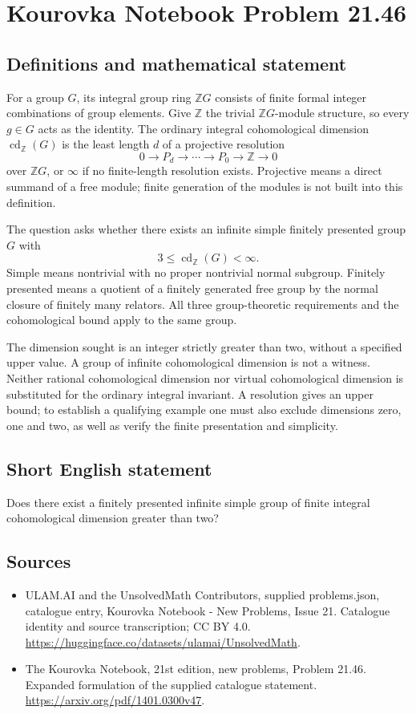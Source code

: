 \documentclass[11pt,a4paper]{article}
\begin{document}
\section*{Kourovka Notebook Problem 21.46}\label{statement}

\subsection{Definitions and mathematical statement}
For a group $G$, its integral group ring $\mathbb ZG$ consists of
finite formal integer combinations of group elements. Give $\mathbb Z$
the trivial $\mathbb ZG$-module structure, so every $g\in G$ acts as
the identity. The ordinary integral cohomological dimension
$\operatorname{cd}_{\mathbb Z}(G)$ is the least length $d$ of a projective
resolution
\[
 0\longrightarrow P_d\longrightarrow\cdots\longrightarrow P_0
          \longrightarrow\mathbb Z\longrightarrow0
\]
over $\mathbb ZG$, or $\infty$ if no finite-length resolution exists.
Projective means a direct summand of a free module; finite generation
of the modules is not built into this definition.

The question asks whether there exists an infinite simple finitely
presented group $G$ with
\[
 3\le\operatorname{cd}_{\mathbb Z}(G)<\infty.
\]
Simple means nontrivial with no proper nontrivial normal subgroup.
Finitely presented means a quotient of a finitely generated free group
by the normal closure of finitely many relators. All three group-theoretic
requirements and the cohomological bound apply to the same group.

The dimension sought is an integer strictly greater than two, without
a specified upper value. A group of infinite cohomological dimension
is not a witness. Neither rational cohomological dimension nor virtual
cohomological dimension is substituted for the ordinary integral
invariant. A resolution gives an upper bound; to establish a qualifying
example one must also exclude dimensions zero, one and two, as well
as verify the finite presentation and simplicity.
\subsection{Short English statement}
Does there exist a finitely presented infinite simple group of finite integral cohomological dimension greater than two?
\subsection{Sources}
\begin{itemize}
\item[S1] ULAM.AI and the UnsolvedMath Contributors, supplied problems.json, catalogue entry, Kourovka Notebook - New Problems, Issue 21. Catalogue identity and source transcription; CC BY 4.0.
\url{https://huggingface.co/datasets/ulamai/UnsolvedMath}.
\item[S2] The Kourovka Notebook, 21st edition, new problems, Problem 21.46. Expanded formulation of the supplied catalogue statement.
\url{https://arxiv.org/pdf/1401.0300v47}.
\end{itemize}
\end{document}
